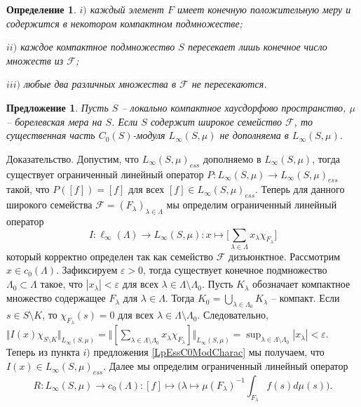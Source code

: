 \documentclass[12pt]{article}
\numberwithin{equation}{subsection}
\theoremstyle{plain}
\newtheorem{proposition}{Предложение}
\newtheorem{definition}{Определение}
\newenvironment{proof}{Доказательство.}{}
\begin{document}
\begin{fulltext}
\begin{definition}
        $i)$ каждый элемент $F$ имеет конечную положительную меру и содержится в некотором компактном подмножестве;

        $ii)$ каждое компактное подмножество $S$ пересекает лишь конечное число множеств из $\mathcal{F}$;

        $iii)$ любые два различных множества в $\mathcal{F}$ не пересекаются.
    \end{definition}

    \begin{proposition}\label{LInfEssNotCompl} Пусть $S$ -- локально компактное хаусдорфово пространст\-во, $\mu$ -- борелевская мера на $S$. Если $S$ содержит широкое семейство $\mathcal{F}$, то существенная часть $C_0(S)$-модуля $L_\infty(S,\mu)$ не дополняема в $L_\infty(S,\mu)$.
    \end{proposition}
    \begin{proof} Допустим, что $L_\infty(S,\mu)_{ess}$ дополняемо в $L_\infty(S,\mu)$, тогда существует ограниченный линейный оператор $P:L_\infty(S,\mu)\to L_\infty(S,\mu)_{ess}$ такой, что $P([f])=[f]$ для всех $[f]\in L_\infty(S,\mu)_{ess}$. Теперь для данного широкого семейства $\mathcal{F}=(F_\lambda)_{\lambda\in\Lambda}$ мы определим ограниченный линейный оператор
        $$
            I:\ell_\infty(\Lambda)\to L_\infty(S,\mu): x\mapsto \biggl[\sum_{\lambda\in\Lambda}x_\lambda \chi_{F_\lambda}\biggr]
        $$
        который корректно определен так как семейство $\mathcal{F}$ дизъюнктное. Рассмотрим $x\in c_0(\Lambda)$. Зафиксируем $\varepsilon > 0$, тогда существует конечное подмножество $\Lambda_0\subset\Lambda$ такое, что $|x_\lambda|<\varepsilon$ для всех $\lambda\in\Lambda\setminus\Lambda_0$. Пусть $K_\lambda$ обозначает компактное множество содержащее $F_\lambda$ для $\lambda\in\Lambda$. Тогда $K_0=\bigcup_{\lambda\in\Lambda_0}K_\lambda$ -- компакт. Если $s\in S\setminus K$, то $\chi_{F_\lambda}(s)=0$ для всех $\lambda\in\Lambda\setminus\Lambda_0$. Следовательно, $\Vert I(x)\chi_{S\setminus K}\Vert_{L_\infty(S,\mu)}=\Vert[\sum_{\lambda\in\Lambda\setminus\Lambda_0}x_\lambda\chi_{F_\lambda}] \Vert_{L_\infty(S,\mu)}=\sup_{\lambda\in\Lambda\setminus\Lambda_0}|x_\lambda|<\varepsilon$. Теперь из пункта $i)$ предложения \ref{LpEssC0ModCharac} мы получаем, что $I(x)\in L_\infty(S,\mu)_{ess}$. Далее мы определим ограниченный линейный оператор
        $$
            R:L_\infty(S,\mu)\to c_0(\Lambda): [f]\mapsto \biggl(\lambda\mapsto\mu(F_\lambda)^{-1}\int_{F_\lambda} f(s)d\mu(s)\biggr).
        $$

\end{proof}
\end{fulltext}
\end{document}
